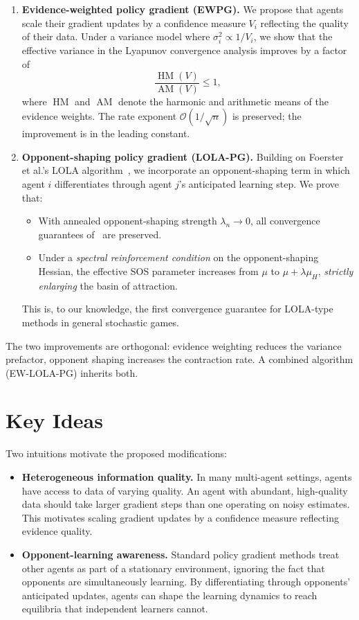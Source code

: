 \begin{enumerate}
    \item \textbf{Evidence-weighted policy gradient (EWPG).} We propose that agents scale their gradient updates by a confidence measure $V_i$ reflecting the quality of their data. Under a variance model where $\sigma_i^2 \propto 1/V_i$, we show that the effective variance in the Lyapunov convergence analysis improves by a factor of
    \[
        \frac{\operatorname{HM}(V)}{\operatorname{AM}(V)} \leq 1,
    \]
    where $\operatorname{HM}$ and $\operatorname{AM}$ denote the harmonic and arithmetic means of the evidence weights. The rate exponent $\mathcal{O}(1/\sqrt{n})$ is preserved; the improvement is in the leading constant.

    \item \textbf{Opponent-shaping policy gradient (LOLA-PG).} Building on Foerster et al.'s LOLA algorithm~\cite{foerster2018lola}, we incorporate an opponent-shaping term in which agent $i$ differentiates through agent $j$'s anticipated learning step. We prove that:
    \begin{itemize}
        \item With annealed opponent-shaping strength $\lambda_n \to 0$, all convergence guarantees of~\cite{giannou2022} are preserved.
        \item Under a \emph{spectral reinforcement condition} on the opponent-shaping Hessian, the effective SOS parameter increases from $\mu$ to $\mu + \lambda\mu_H$, \emph{strictly enlarging} the basin of attraction.
    \end{itemize}
    This is, to our knowledge, the first convergence guarantee for LOLA-type methods in general stochastic games.
\end{enumerate}

The two improvements are orthogonal: evidence weighting reduces the variance prefactor, opponent shaping increases the contraction rate. A combined algorithm (EW-LOLA-PG) inherits both.

\section{Key Ideas}

Two intuitions motivate the proposed modifications:
\begin{itemize}
    \item \textbf{Heterogeneous information quality.} In many multi-agent settings, agents have access to data of varying quality. An agent with abundant, high-quality data should take larger gradient steps than one operating on noisy estimates. This motivates scaling gradient updates by a confidence measure reflecting evidence quality.
    \item \textbf{Opponent-learning awareness.} Standard policy gradient methods treat other agents as part of a stationary environment, ignoring the fact that opponents are simultaneously learning. By differentiating through opponents' anticipated updates, agents can shape the learning dynamics to reach equilibria that independent learners cannot.
\end{itemize}

